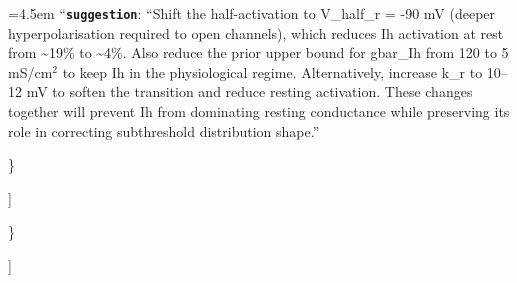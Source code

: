\begin{tcolorbox}
\par\noindent\hangindent=4.5em \hspace*{3.0em}\hspace*{1.5em}``\textbf{\texttt{suggestion}}\textquotesingle\textquotesingle: ``Shift the half-activation to V\_half\_r = -90 mV (deeper hyperpolarisation required to open channels), which reduces Ih activation at rest from \textasciitilde{}19\% to \textasciitilde{}4\%. Also reduce the prior upper bound for gbar\_Ih from 120 to 5 mS/cm$^{2}$ to keep Ih in the physiological regime. Alternatively, increase k\_r to 10--12 mV to soften the transition and reduce resting activation. These changes together will prevent Ih from dominating resting conductance while preserving its role in correcting subthreshold distribution shape.''
\par\noindent \hspace*{3.0em}\}
\par\noindent \hspace*{1.5em}]
\par\noindent \}
\smallskip
\par\noindent [[ \#\# completed \#\# ]]\\
\noindent
\smallskip
\end{tcolorbox}
\vspace{0.35em}
